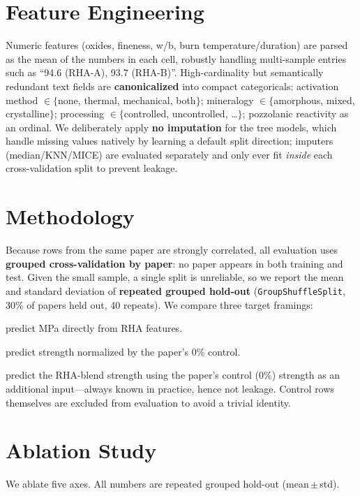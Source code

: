 \documentclass[11pt]{article}
\begin{document}
\section{Feature Engineering}
Numeric features (oxides, fineness, w/b, burn temperature/duration) are parsed as the
mean of the numbers in each cell, robustly handling multi-sample entries such as
``94.6 (RHA-A), 93.7 (RHA-B)''. High-cardinality but semantically redundant text
fields are \textbf{canonicalized} into compact categoricals: activation method
$\in\{$none, thermal, mechanical, both$\}$; mineralogy $\in\{$amorphous, mixed,
crystalline$\}$; processing $\in\{$controlled, uncontrolled, \dots$\}$; pozzolanic
reactivity as an ordinal. We deliberately apply \textbf{no imputation} for the
tree models, which handle missing values natively by learning a default split
direction; imputers (median/KNN/MICE) are evaluated separately and only ever fit
\emph{inside} each cross-validation split to prevent leakage.

\section{Methodology}
Because rows from the same paper are strongly correlated, all evaluation uses
\textbf{grouped cross-validation by paper}: no paper appears in both training and test.
Given the small sample, a single split is unreliable, so we report the mean and
standard deviation of \textbf{repeated grouped hold-out} (\texttt{GroupShuffleSplit},
30\% of papers held out, 40 repeats). We compare three target framings:
\begin{description}\itemsep2pt
  \item[A. Absolute strength, all papers] predict MPa directly from RHA features.
  \item[B. Relative-to-control] predict strength normalized by the paper's 0\% control.
  \item[C. Absolute strength given control] predict the RHA-blend strength using the
        paper's control (0\%) strength as an additional input---always known in
        practice, hence not leakage. Control rows themselves are excluded from
        evaluation to avoid a trivial identity.
\end{description}

\section{Ablation Study}
We ablate five axes. All numbers are repeated grouped hold-out (mean\,$\pm$\,std).
\end{document}
